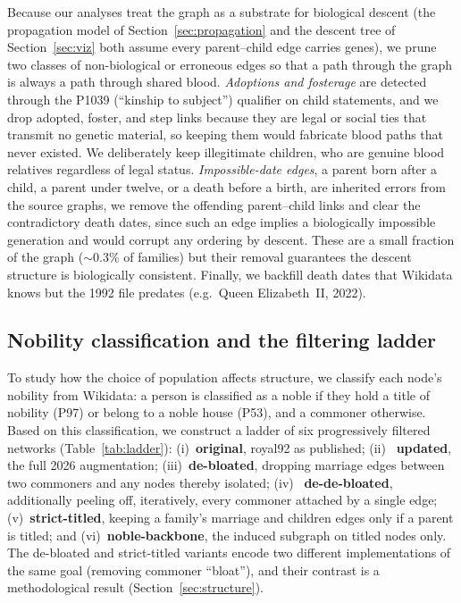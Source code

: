 Because our analyses treat the graph as a substrate for biological descent (the
propagation model of Section~\ref{sec:propagation} and the descent tree of
Section~\ref{sec:viz} both assume every parent--child edge carries genes), we
prune two classes of non-biological or erroneous edges so that a path through the
graph is always a path through shared blood. \emph{Adoptions and fosterage} are
detected through the P1039 (``kinship to subject'') qualifier on child statements,
and we drop adopted, foster, and step links because they are legal or social
ties that transmit no genetic material, so keeping them would fabricate blood
paths that never existed. We deliberately keep illegitimate children, who are
genuine blood relatives regardless of legal status. \emph{Impossible-date edges},
a parent born after a child, a parent under twelve, or a death before a birth,
are inherited errors from the source graphs, we remove the offending
parent--child links and clear the contradictory death dates, since such an edge
implies a biologically impossible generation and would corrupt any ordering by
descent. These are a small fraction of the graph ($\sim$0.3\% of families) but
their removal guarantees the descent structure is biologically consistent.
Finally, we backfill death dates that Wikidata knows but the 1992 file predates
(e.g.\ Queen Elizabeth~II, 2022).


\subsection{Nobility classification and the filtering ladder}
\label{sub:filter}

To study how the choice of population affects structure, we classify each node's
nobility from Wikidata: a person is classified as a noble if they hold a title of nobility
(P97) or belong to a noble house (P53), and a commoner otherwise. Based on this classification, we construct a ladder of six progressively filtered networks
(Table~\ref{tab:ladder}): (i)~\textbf{original}, royal92 as published; (ii)~%
\textbf{updated}, the full 2026 augmentation; (iii)~\textbf{de-bloated}, dropping
marriage edges between two commoners and any nodes thereby isolated; (iv)~%
\textbf{de-de-bloated}, additionally peeling off, iteratively, every commoner
attached by a single edge; (v)~\textbf{strict-titled}, keeping a family's marriage
and children edges only if a parent is titled; and (vi)~\textbf{noble-backbone},
the induced subgraph on titled nodes only. The de-bloated and strict-titled
variants encode two different implementations of the same goal (removing commoner
``bloat''), and their contrast is a methodological result (Section~\ref{sec:structure}).

